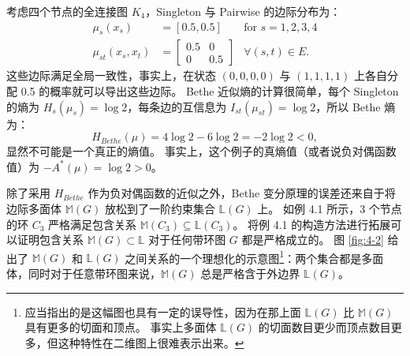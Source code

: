 \begin{tcolorbox}
\begin{exam}

考虑四个节点的全连接图 $K_4$，Singleton 与 Pairwise 的边际分布为：
\begin{subequations}
\begin{align}
    \mu_s(x_s) &= [0.5, 0.5] &\text{for } s = 1, 2, 3, 4 \\
    \mu_{st}(x_s, x_t) &= \begin{bmatrix}
        0.5 & 0 \\
        0 & 0.5
    \end{bmatrix} &\forall (s, t) \in E.
\end{align}
\end{subequations}
这些边际满足全局一致性，事实上，在状态 $(0, 0, 0, 0)$ 与 $(1, 1, 1, 1)$ 上各自分配 0.5 的概率就可以导出这些边际。
Bethe 近似熵的计算很简单，每个 Singleton 的熵为 $H_s(\mu_s) = \log 2$，每条边的互信息为 $I_{st}(\mu_{st}) = \log 2$，所以 Bethe 熵为：
\begin{equation*}
    H_{Bethe}(\mu) = 4\log 2 - 6\log 2 = -2\log 2 < 0,
\end{equation*}
显然不可能是一个真正的熵值。
事实上，这个例子的真熵值（或者说负对偶函数值）为 $-A^*(\mu) = \log 2 > 0$。

\end{exam}
\end{tcolorbox}

除了采用 $H_{Bethe}$ 作为负对偶函数的近似之外，Bethe 变分原理的误差还来自于将边际多面体 $\mathbb{M}(G)$ 放松到了一阶约束集合 $\mathbb{L}(G)$ 上。
如例 4.1 所示，3 个节点的环 $C_3$ 严格满足包含关系 $\mathbb{M}(C_3) \subseteq \mathbb{L}(C_3)$。
将例 4.1 的构造方法进行拓展可以证明包含关系 $\mathbb{M}(G) \subset \mathbb{L}$ 对于任何带环图 $G$ 都是严格成立的。
图 \ref{fig:4-2} 给出了 $\mathbb{M}(G)$ 和 $\mathbb{L}(G)$ 之间关系的一个理想化的示意图\footnote{
    应当指出的是这幅图也具有一定的误导性，因为在那上面 $\mathbb{L}(G)$ 比 $\mathbb{M}(G)$ 具有更多的切面和顶点。
    事实上多面体 $\mathbb{L}(G)$ 的切面数目更少而顶点数目更多，但这种特性在二维图上很难表示出来。
}：两个集合都是多面体，同时对于任意带环图来说，$\mathbb{M}(G)$ 总是严格含于外边界 $\mathbb{L}(G)$。

